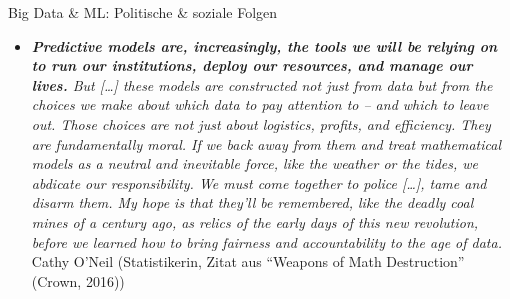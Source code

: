 \documentclass[
  10pt,
  ignorenonframetext,
]{beamer}
\providecommand{\tightlist}{%
  \setlength{\itemsep}{0pt}\setlength{\parskip}{0pt}}
\begin{document}
\begin{frame}{Big Data \& ML: Politische \& soziale Folgen}
\label{big-data-ml-politische-soziale-folgen-1}
\begin{itemize}[<+->]
\tightlist
\item
  \emph{\textbf{Predictive models are, increasingly, the tools we will
  be relying on to run our institutions, deploy our resources, and
  manage our lives.} But {[}\ldots{]} these models are constructed not
  just from data but from the choices we make about which data to pay
  attention to -- and which to leave out. Those choices are not just
  about logistics, profits, and efficiency. They are fundamentally
  moral. If we back away from them and treat mathematical models as a
  neutral and inevitable force, like the weather or the tides, we
  abdicate our responsibility. We must come together to police
  {[}\ldots{]}, tame and disarm them. My hope is that they'll be
  remembered, like the deadly coal mines of a century ago, as relics of
  the early days of this new revolution, before we learned how to bring
  fairness and accountability to the age of data.}\\
  Cathy O'Neil (Statistikerin, Zitat aus ``Weapons of Math Destruction''
  (Crown, 2016))
\end{itemize}
\end{frame}
\end{document}
